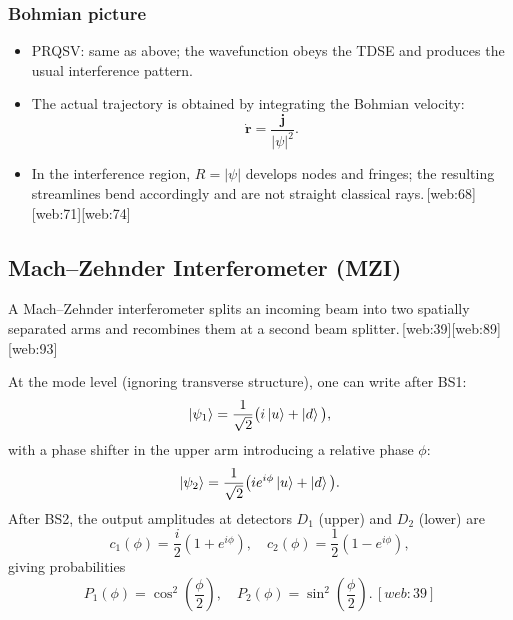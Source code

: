 \documentclass[11pt]{article}
\begin{document}
\subsubsection{Bohmian picture}

\begin{itemize}[leftmargin=*]
  \item PRQSV: same as above; the wavefunction obeys the TDSE and produces the usual interference pattern.
  \item The actual trajectory is obtained by integrating the Bohmian velocity:
  \begin{equation}
  \dot{\mathbf r} = \frac{\mathbf j}{|\psi|^2}.\label{eq:bohm-velocity}
  \end{equation}
  \item In the interference region, \(R=|\psi|\) develops nodes and fringes; the resulting streamlines bend accordingly and are not straight classical rays.\,[web:68][web:71][web:74]
\end{itemize}

\subsection{Mach--Zehnder Interferometer (MZI)}

A Mach--Zehnder interferometer splits an incoming beam into two spatially separated arms and recombines them at a second beam splitter.\,[web:39][web:89][web:93]

At the mode level (ignoring transverse structure), one can write after BS1:
\begin{equation}
\ket{\psi_1} = \frac{1}{\sqrt{2}}\big(i\ket{u} + \ket{d}\big),
\end{equation}
with a phase shifter in the upper arm introducing a relative phase \(\phi\):
\begin{equation}
\ket{\psi_2} = \frac{1}{\sqrt{2}}\big(i e^{i\phi}\ket{u} + \ket{d}\big).
\end{equation}
After BS2, the output amplitudes at detectors \(D_1\) (upper) and \(D_2\) (lower) are
\begin{equation}
c_1(\phi) = \frac{i}{2}(1+e^{i\phi}),\quad
c_2(\phi) = \frac{1}{2}(1-e^{i\phi}),
\end{equation}
giving probabilities
\begin{equation}
P_1(\phi) = \cos^2\left(\frac{\phi}{2}\right),\quad
P_2(\phi) = \sin^2\left(\frac{\phi}{2}\right).\,[web:39]
\end{equation}
\end{document}
